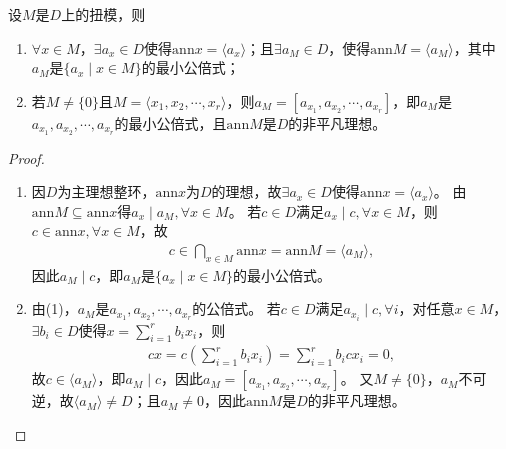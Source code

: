 \documentclass[../../main.tex]{subfiles}%
\begin{document}
\begin{lemma}
设$M$是$D$上的扭模，则
\begin{enumerate}[(1)]
\item $\forall x\in M$，$\exists a_x\in D$使得$\mathrm{ann}x=\langle a_x\rangle$；且$\exists a_M\in D$，使得$\mathrm{ann}M=\langle a_M\rangle$，其中$a_M$是$\{a_x\mid x\in M\}$的最小公倍式；
\item 若$M\neq\{0\}$且$M=\langle x_1,x_2,\cdots,x_r\rangle$，则$a_M=[a_{x_1},a_{x_2},\cdots,a_{x_r}]$，即$a_M$是$a_{x_1},a_{x_2},\cdots,a_{x_r}$的最小公倍式，且$\mathrm{ann}M$是$D$的非平凡理想。
\end{enumerate}
\end{lemma}
\begin{proof}
\begin{enumerate}[(1)]
\item 因$D$为主理想整环，$\mathrm{ann}x$为$D$的理想，故$\exists a_x\in D$使得$\mathrm{ann}x=\langle a_x\rangle$。
由$\mathrm{ann}M\subseteq\mathrm{ann}x$得$a_x\mid a_M,\forall x\in M$。
若$c\in D$满足$a_x\mid c,\forall x\in M$，则$c\in\mathrm{ann}x,\forall x\in M$，故
\begin{align*}
c\in\bigcap\limits_{x\in M}\mathrm{ann}x=\mathrm{ann}M=\langle a_M\rangle,
\end{align*}
因此$a_M\mid c$，即$a_M$是$\{a_x\mid x\in M\}$的最小公倍式。

\item 由(1)，$a_M$是$a_{x_1},a_{x_2},\cdots,a_{x_r}$的公倍式。
若$c\in D$满足$a_{x_i}\mid c,\forall i$，对任意$x\in M$，$\exists b_i\in D$使得$x=\sum\limits_{i=1}^{r}b_ix_i$，则
\begin{align*}
cx=c\left(\sum\limits_{i=1}^{r}b_ix_i\right)=\sum\limits_{i=1}^{r}b_icx_i=0,
\end{align*}
故$c\in\langle a_M\rangle$，即$a_M\mid c$，因此$a_M=[a_{x_1},a_{x_2},\cdots,a_{x_r}]$。
又$M\neq\{0\}$，$a_M$不可逆，故$\langle a_M\rangle\neq D$；且$a_M\neq0$，因此$\mathrm{ann}M$是$D$的非平凡理想。
\end{enumerate}
\end{proof}
\end{document}
